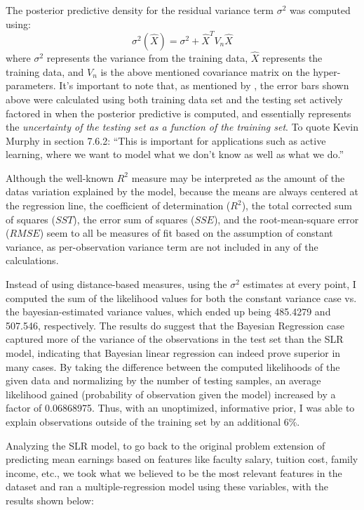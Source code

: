 \documentclass[10pt]{article}
\begin{document}
The posterior predictive density for the residual variance term $\sigma^2$ was computed using: 
	$$\sigma^2(\hat{X}) = \sigma^2 + \hat{X}^{T} V_n \hat{X} $$ 
where $\sigma^2$ represents the variance from the training data, $\hat{X}$ represents the training data, and $V_n$ is the above mentioned covariance matrix on the hyper-parameters. It's important to note that, as mentioned by \cite{murphy2012machine}, the error bars shown above were calculated using both training data set and the testing set actively factored in when the posterior predictive is computed, and essentially represents the {\it uncertainty of the testing set as a function of the training set}. To quote Kevin Murphy in section 7.6.2: ``This is important for applications such as active learning, where we want to model what we don't know as well as what we do.''

Although the well-known $R^2$ measure may be interpreted as the amount of the datas variation explained by the model\cite{walpole1993probability}, because the means are always centered at the regression line, the coefficient of determination ($R^2$), the total corrected sum of squares ($SST$), the error sum of squares ($SSE$), and the root-mean-square error ($RMSE$) seem to all be measures of fit based on the assumption of constant variance, as per-observation variance term are not included in any of the calculations. 

Instead of using distance-based measures, using the $\sigma^2$ estimates at every point, I computed the sum of the likelihood values for both the constant variance case vs. the bayesian-estimated variance values, which ended up being 485.4279 and 507.546, respectively. The results do suggest that the Bayesian Regression case captured more of the variance of the observations in the test set than the SLR model, indicating that Bayesian linear regression can indeed prove superior in many cases. By taking the difference between the computed likelihoods of the given data and normalizing by the number of testing samples, an average likelihood gained (probability of observation given the model) increased by a factor of 0.06868975. Thus, with an unoptimized, informative prior, I was able to explain observations outside of the training set by an additional 6\%. 

Analyzing the SLR model, to go back to the original problem extension of predicting mean earnings based on features like faculty salary, tuition cost, family income, etc., we took what we believed to be the most relevant features in the dataset and ran a multiple-regression model using these variables, with the results shown below:  
\end{document}
